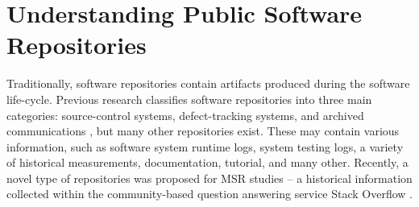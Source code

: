 \section{Understanding Public Software Repositories}
Traditionally, software repositories contain artifacts produced during the software life-cycle. 
Previous research classifies software repositories into three main categories: source-control systems, 
defect-tracking systems, and archived communications \cite{citeulike:4534888}, but many other repositories exist. 
These may contain various information, such as software system runtime logs, system testing logs, 
a variety of historical measurements, documentation, tutorial, and many other.
Recently, a novel type of repositories was proposed for MSR studies -- a historical information collected within the 
community-based question answering service Stack Overflow \cite{MSRChallenge2013}.


